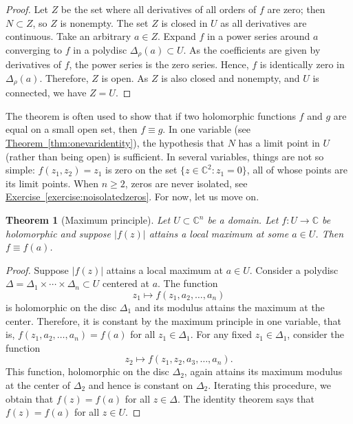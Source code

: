 \documentclass[12pt,openany]{book}
\newcommand{\sabs}[1]{\lvert {#1} \rvert}
\newcommand{\C}{{\mathbb{C}}}
\theoremstyle{plain}
\newtheorem{thm}{Theorem}[section]
\theoremstyle{remark}
\theoremstyle{definition}
\theoremstyle{exercise}
\theoremstyle{example}
\newcommand{\exerciseref}[1]{\hyperref[#1]{Exercise~\ref*{#1}}}
\newcommand{\thmref}[1]{\hyperref[#1]{Theorem~\ref*{#1}}}
\begin{document}
\begin{proof}
Let $Z$ be the set where all derivatives of all orders of $f$ are zero; then
$N \subset Z$, so $Z$ is nonempty.  The set $Z$ is closed in $U$
as all derivatives are continuous.
Take an arbitrary $a \in Z$.
Expand $f$
in a power series around $a$ converging to $f$ in a polydisc
$\Delta_\rho(a) \subset U$.
As the coefficients are given by derivatives
of $f$, the power series is the zero series.  Hence, $f$ is
identically zero in $\Delta_\rho(a)$.  Therefore, $Z$ is open.
As $Z$ is also closed and nonempty, and $U$ is connected,
we have $Z = U$.
\end{proof}

The theorem is often used to show that
if two holomorphic functions $f$ and $g$
are equal on a small open set,
then $f \equiv g$.  In one variable (see \thmref{thm:onevaridentity}),
the hypothesis that $N$ has a limit point in $U$ (rather than being open)
is sufficient.  In several
variables, things are not so simple: $f(z_1,z_2) = z_1$ is zero on the set
$\{ z \in \C^2 : z_1=0 \}$, all of whose points are its limit points.
When $n \geq 2$, zeros are never isolated,
see \exerciseref{exercise:noisolatedzeros}.
For now, let us move on.

\begin{thm}[Maximum principle]
Let $U \subset \C^n$ be a domain.
Let $f \colon U \to \C$ be holomorphic and suppose $\sabs{f(z)}$
attains a local maximum at some $a \in U$.  Then $f \equiv f(a)$.
\end{thm}

\begin{proof}
Suppose $\sabs{f(z)}$ attains a local maximum at $a \in U$.  Consider a polydisc
$\Delta = \Delta_1 \times \cdots \times \Delta_n \subset U$
centered at $a$.  The function
\begin{equation*}
z_1 \mapsto f(z_1,a_2,\ldots,a_n)
\end{equation*}
is holomorphic
on the disc $\Delta_1$ and its modulus attains the maximum
at the center.  Therefore, it is constant by the maximum principle in one variable,
that is, $f(z_1,a_2,\ldots,a_n)  = f(a)$ for all $z_1 \in \Delta_1$.  For
any fixed $z_1
\in \Delta_1$, consider the function
\begin{equation*}
z_2 \mapsto f(z_1,z_2,a_3,\ldots,a_n)  .
\end{equation*}
This function, holomorphic on the disc $\Delta_2$, again attains its maximum modulus at the center of $\Delta_2$
and hence is constant on $\Delta_2$.  Iterating this procedure, we obtain
that $f(z) = f(a)$ for all $z \in \Delta$.  The identity theorem says
that $f(z) = f(a)$ for all $z \in U$.
\end{proof}
\end{document}
